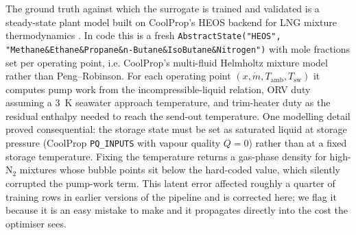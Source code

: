 \documentclass[11pt]{article}
\begin{document}
The ground truth against which the surrogate is trained and validated is a
steady-state plant model built on CoolProp's HEOS backend for LNG mixture
thermodynamics \citep{bell2014pure,kunz2012gerg2008,huber2022refprop}. In code this is a fresh
\texttt{AbstractState("HEOS", "Methane\&Ethane\&Propane\&n-Butane\&IsoButane\&Nitrogen")}
with mole fractions set per operating point, i.e. CoolProp's multi-fluid
Helmholtz mixture model rather than Peng--Robinson. For each operating point
$(x, \dot m, T_{\text{amb}}, T_{\text{sw}})$ it computes pump work from the
incompressible-liquid relation, ORV duty assuming a \SI{3}{\kelvin} seawater
approach temperature, and trim-heater duty as the residual enthalpy needed
to reach the send-out temperature. One modelling detail proved
consequential: the storage state must be set as saturated liquid at storage
pressure (CoolProp \texttt{PQ\_INPUTS} with vapour quality $Q=0$) rather than
at a fixed storage temperature. Fixing the temperature returns a gas-phase
density for high-N$_2$ mixtures whose bubble points sit below the hard-coded
value, which silently corrupted the pump-work term. This latent error
affected roughly a quarter of training rows in earlier versions of the
pipeline and is corrected here; we flag it because it is an easy mistake to
make and it propagates directly into the cost the optimiser sees.
\end{document}

